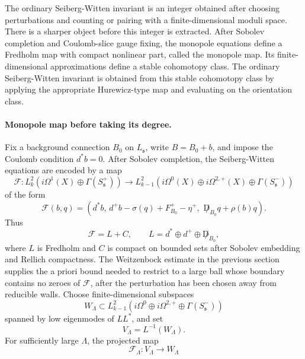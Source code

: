 The ordinary Seiberg-Witten invariant is an integer obtained after choosing
perturbations and counting or pairing with a finite-dimensional moduli space.
There is a sharper object before this integer is extracted.  After Sobolev
completion and Coulomb-slice gauge fixing, the monopole equations define a
Fredholm map with compact nonlinear part, called the monopole map.  Its
finite-dimensional approximations define a stable cohomotopy class.  The
ordinary Seiberg-Witten invariant is obtained from this stable cohomotopy
class by applying the appropriate Hurewicz-type map and evaluating on the
orientation class.

\paragraph{Monopole map before taking its degree.}
Fix a background connection \(B_0\) on \(L_{\mathfrak s}\), write
\(B=B_0+b\), and impose the Coulomb condition \(d^*b=0\).  After Sobolev
completion, the Seiberg-Witten equations are encoded by a map
\begin{equation}
  \mathcal F:
  L^2_k\!\left(i\Omega^1(X)\oplus\Gamma(S^+_{\mathfrak s})\right)
  \longrightarrow
  L^2_{k-1}\!\left(
    i\Omega^0(X)\oplus i\Omega^{2,+}(X)\oplus
    \Gamma(S^-_{\mathfrak s})
  \right)
  \label{eq:monopole-map-sobolev}
\end{equation}
of the form
\begin{equation}
  \mathcal F(b,q)
  =
  \left(
    d^*b,\,
    d^+b-\sigma(q)+F_{B_0}^+-\eta^+,\,\,
    \not D_{B_0}q+\rho(b)q
  \right).
  \label{eq:monopole-map-components}
\end{equation}
Thus
\begin{equation}
  \mathcal F=L+C ,
  \qquad
  L=d^*\oplus d^+\oplus \not D_{B_0},
  \label{eq:monopole-map-linear-compact-split}
\end{equation}
where \(L\) is Fredholm and \(C\) is compact on bounded sets after Sobolev
embedding and Rellich compactness.  The Weitzenbock estimate in the previous
section supplies the a priori bound needed to restrict to a large ball whose
boundary contains no zeroes of \(\mathcal F\), after the perturbation has been
chosen away from reducible walls.  Choose finite-dimensional subspaces
\[
  W_\Lambda\subset
  L^2_{k-1}\!\left(
    i\Omega^0\oplus i\Omega^{2,+}\oplus\Gamma(S^-_{\mathfrak s})
  \right)
\]
spanned by low eigenmodes of \(LL^*\), and set
\[
  V_\Lambda=L^{-1}(W_\Lambda).
\]
For sufficiently large \(\Lambda\), the projected map
\begin{equation}
  \mathcal F_\Lambda:
  V_\Lambda\longrightarrow W_\Lambda
  \label{eq:finite-dimensional-monopole-map}
\end{equation}
